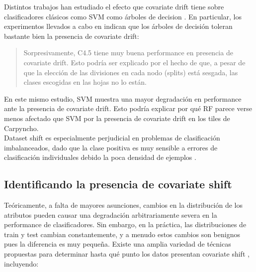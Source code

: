 Distintos trabajos han estudiado el efecto que covariate drift tiene sobre clasificadores clásicos como  SVM como árboles de decision \cite{non-stationary}. En particular, los experimentos llevados a cabo en \cite{selectionbias} indican que los árboles de decisión toleran bastante bien la presencia de covariate drift:

\begin{quotation}
Sorpresivamente, C4.5 tiene muy buena performance en presencia de covariate drift. Esto podría ser explicado por el hecho de que, a pesar de que la elección de las divisiones en cada nodo (splits) está sesgada, las clases escogidas en las hojas no lo están.
\end{quotation}

En este mismo estudio, SVM muestra una mayor degradación en performance ante la presencia de covariate drift. Esto podría explicar por qué RF parece verse menos afectado que SVM por la presencia de covariate drift en los tiles de Carpyncho. \\

Dataset shift es especialmente perjudicial en problemas de clasificación imbalanceados, dado que la clase positiva es muy sensible a errores de clasificación individuales debido la poca densidad de ejemplos \cite{LOPEZ20141}.

\subsection{Identificando la presencia de covariate shift}

Teóricamente, a falta de mayores asunciones, cambios en la distribución de los atributos pueden causar una degradación arbitrariamente severa en la performance de clasificadores. Sin embargo, en la práctica, las distribuciones de train y test cambian constantemente, y a menudo estos cambios son benignos pues la diferencia es muy pequeña. Existe una amplia variedad de técnicas propuestas para determinar hasta qué punto los datos presentan covariate shift \cite{rabanser2019failing} \cite{GeetaDharani2019CovariateSA}, incluyendo:


